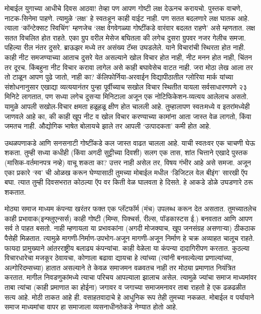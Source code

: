 मोबाईल युगाच्या आधीचे दिवस आठवा! तेव्हा पण आपण गोष्टी लक्ष देऊनच करायचो. पुस्तक वाचणे, नाटक-सिनेमा पाहणे. त्यामुळे `लक्ष' हे स्वतःहून काही वाईट नाही. पण सतत बदलणारे लक्ष घातक आहे. त्याला `कॉन्टेक्सट स्विचिंग' म्हणजेच `लक्ष वेगवेगळ्या गोष्टींकडे वारंवार बदलत राहणे' असे म्हणतात. लक्ष सतत विचलित होत राहते. एका ग्रुप वरील मेसेज बघितला की लगेच दुसरा ग्रुपवर नजर गेलीच समजा. पहिल्या रील नंतर दुसरे. ब्राऊझर मध्ये तर असंख्य टॅब्स उघडलेले. याने विचारांची स्थिरता होत नाही. काही नीट समजण्याच्या आताच दुसरे येत असल्याने खोल विचार होत नाही, नीट मनन होत नाही, चिंतन तर दूरच. किंबहुना नीट विचार करावा लागेल असे काही बघावेसेच वाटत नाही. जरा मोठा लेख आला तर तो टाळून आपण पुढे जातो, नाही का? कॅलिफोर्निया-अरवाईन विद्यापीठातील ग्लोरिया मार्क यांच्या संशोधनानुसार एखाद्या व्यत्ययानंतर पुन्हा पूर्वीच्याच सखोल विचार स्थितीत यायला सर्वसाधारणपणे २३ मिनिटे लागतात, पण सध्या लगेच दुसऱ्या मिनिटाला अजून एक नोटिफिकेशन-व्यत्यय आलेलाच असतो. यामुळे आपली सखोल-विचार क्षमता हळूहळू क्षीण होत चालली आहे. तुम्हालापण स्वतःमध्ये व इतरांमध्येही जाणवले आहे का, की काही खूप नीट व खोल विचार करण्याच्या कामांना आता जास्त वेळ लागतो, किंवा जमतच नाही. औद्योगिक भाषेत बोलायचे झाले तर आपली `उत्पादकता' कमी होत आहे.

उथळपणाकडे आणि सनसनाटी गोष्टींकडे कल जास्त वाढत चालला आहे. याची स्वतःवर एक चाचणी घेऊ शकता. तुम्ही सध्या कधीही (किंवा अगदी सुट्टीच्या दिवशी) सलग एक तास, शांत चित्ताने एखादे पुस्तक (मासिक-वर्तमानपत्र नव्हे) वाचू शकता का? उत्तर नाही असेल तर, विषय गंभीर आहे असे समजा. अजून एका प्रकारे `स्व' ची ओळख करून घेण्यासाठी तुमच्या मोबाईल मधील `डिजिटल वेल बीइंग' सारखी ऍप बघा. त्यात तुम्ही दिवसभरात कोठल्या ऍप वर किती वेळ घालवता हे दिसते. हे आकडे डोळे उघडणारे ठरू शकतात.

मोठ्या समाज माध्यम कंपन्या खरंतर फक्त एक प्लॅटफॉर्म (मंच) उपलब्ध करून देत असतात. तुमच्यातलेच काही  प्रभावाक(इन्फ्लुएन्सर्स) काही गोष्टी (मिम्स, पिक्चर्स, रील्स, पॉडकास्टस ई.) बनवतात आणि आपण सर्व ते पाहत बसतो. नाही म्हणायला या प्रभावकांना (अगदी मोजक्याच, खूप जनसंग्रह असणाऱ्या) ठीकठाक पैसेही मिळतात. त्यामुळे मागणी-निर्माण-उपभोग-अजून मागणी-अजून निर्माण हे चक्र अव्याहत चालूच राहते. फायदा प्रामुख्याने आंतरराष्ट्रीय बलाढ्य कंपन्यांचा. काही वेळेला या कंपन्या दादागिरीपण करतात. कुठल्या विचारधारेचा मजकूर ठेवायचा, कोणाला बढावा द्यायचा हे त्यांच्या (त्यांनी बनवल्येल्या प्रणाल्यांच्या, अल्गोरिदम्सच्या) हातात असल्याने ते केवळ  समाजमन वळवतच नाही तर मोठ्या प्रमाणात नियंत्रित करतात. मागील निवडणुकांमध्ये त्याचा परिचय आपल्याला झालाच असेल. त्यामुळे ज्यांचा समाज माध्यमांवर ताबा त्यांचा (काही प्रमाणात का होईना) जगावर व जगाच्या समाजमनावर ताबा राहतो हे एक ढळढळीत सत्य आहे. मोठी ताकत आहे ही. वसाहतवादाचे हे आधुनिक रूप तेही तुमच्या नकळत. मोबाईल व पर्यायाने समाज माध्यमांचा वापर हा समाजाला व्यसनाधीनतेकडे नेण्यात होतो आहे.


